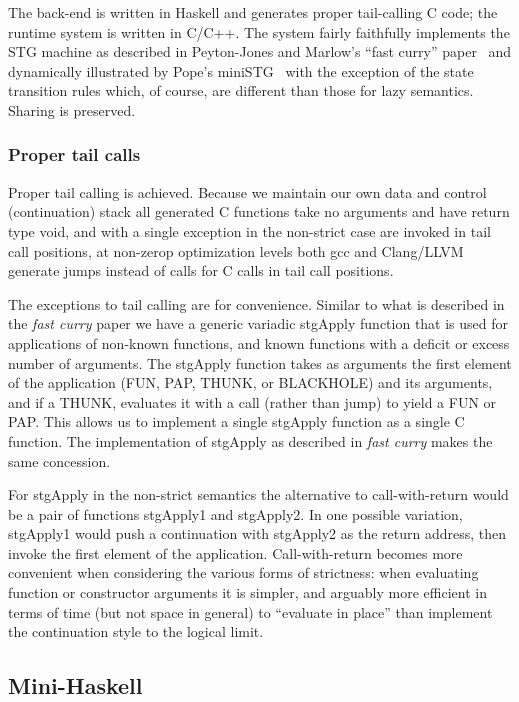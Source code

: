 \documentclass{llncs}
\begin{document}
The back-end is written in Haskell and generates proper tail-calling C code;
the runtime system is written in C/C++.  The system fairly faithfully
implements the STG machine as described in Peyton-Jones and Marlow's ``fast
curry'' paper~\cite{fastcurry} and dynamically illustrated by Pope's
miniSTG~\cite{ministg} with the exception of the state transition rules which,
of course, are different than those for lazy semantics.  Sharing is preserved.

\subsubsection{Proper tail calls}

Proper tail calling is achieved.  Because we maintain our own data and control
(continuation) stack all generated C functions take no arguments and have
return type void, and with a single exception in the non-strict case are
invoked in tail call positions, at non-zerop optimization levels both gcc and
Clang/LLVM generate jumps instead of calls for C calls in tail call positions.

The exceptions to tail calling are for convenience.  Similar to what is
described in the \emph{fast curry} paper we have a generic variadic stgApply
function that is used for applications of non-known functions, and known
functions with a deficit or excess number of arguments.  The stgApply function
takes as arguments the first element of the application (FUN, PAP, THUNK, or
BLACKHOLE) and its arguments, and if a THUNK, evaluates it with a call (rather
than jump) to yield a FUN or PAP.  This allows us to implement a single
stgApply function as a single C function.  The implementation of stgApply as
described in \emph{fast curry} makes the same concession.

For stgApply in the non-strict semantics the alternative to call-with-return
would be a pair of functions stgApply1 and stgApply2.  In one possible variation, 
stgApply1 would push a continuation with stgApply2 as the return address, then
invoke the first element of the application.  Call-with-return becomes more
convenient when considering the various forms of strictness:  when evaluating
function or constructor arguments it is simpler, and arguably more efficient
in terms of time (but not space in general) to ``evaluate in place'' than
implement the continuation style to the logical limit.

\subsection{Mini-Haskell}
\end{document}
